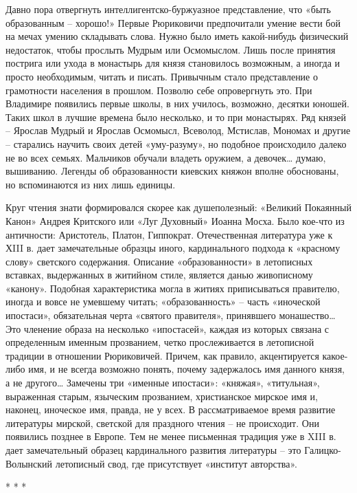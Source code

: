 Давно пора отвергнуть интеллигентско-буржуазное представление, что «быть
образованным – хорошо!» Первые Рюриковичи предпочитали умение вести бой на
мечах умению складывать слова. Нужно было иметь какой-нибудь физический
недостаток, чтобы прослыть Мудрым или Осмомыслом. Лишь после принятия пострига
или ухода в монастырь для князя становилось возможным, а иногда и просто
необходимым, читать и писать. Привычным стало представление о грамотности
населения в прошлом. Позволю себе опровергнуть это. При Владимире появились
первые школы, в них училось, возможно, десятки юношей. Таких школ в лучшие
времена было несколько, и то при монастырях. Ряд князей – Ярослав Мудрый и
Ярослав Осмомысл, Всеволод, Мстислав, Мономах и другие – старались научить
своих детей «уму-разуму», но подобное происходило далеко не во всех семьях.
Мальчиков обучали владеть оружием, а девочек… думаю, вышиванию. Легенды об
образованности киевских княжон вполне обоснованы, но вспоминаются из них лишь
единицы.

Круг чтения знати формировался скорее как душеполезный: «Великий Покаянный
Канон» Андрея Критского или «Луг Духовный» Иоанна Мосха. Было кое-что из
античности: Аристотель, Платон, Гиппократ. Отечественная литература уже к ХIII
в. дает замечательные образцы иного, кардинального подхода к «красному слову»
светского содержания. Описание «образованности» в летописных вставках,
выдержанных в житийном стиле, является данью живописному «канону». Подобная
характеристика могла в житиях приписываться правителю, иногда и вовсе не
умевшему читать; «образованность» – часть «иноческой ипостаси», обязательная
черта «святого правителя», принявшего монашество… Это членение образа на
несколько «ипостасей», каждая из которых связана с определенным именным
прозванием, четко прослеживается в летописной традиции в отношении Рюриковичей.
Причем, как правило, акцентируется какое-либо имя, и не всегда возможно понять,
почему задержалось имя данного князя, а не другого… Замечены три «именные
ипостаси»: «княжая», «титульная», выраженная старым, языческим прозванием,
христианское мирское имя и, наконец, иноческое имя, правда, не у всех. В
рассматриваемое время развитие литературы мирской, светской для праздного
чтения – не происходит. Они появились позднее в Европе. Тем не менее письменная
традиция уже в XIII в. дает замечательный образец кардинального развития
литературы – это Галицко-Волынский летописный свод, где присутствует «институт
авторства».
	
	
* * *

